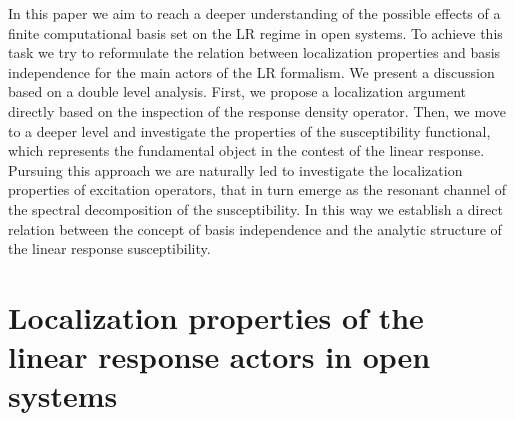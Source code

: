 \documentclass[reprint,aps,prb]{revtex4-1}
\begin{document}
In this paper we aim to reach a deeper understanding of the possible effects of a finite computational basis set on the LR regime in open systems. To achieve this task we try to
reformulate the relation between localization properties and basis independence for the main actors of the LR formalism. We present a discussion based on a double level analysis. First, 
we propose a localization argument directly based on the inspection of the response density operator. Then, we move to a deeper level and investigate the properties of the susceptibility 
functional, which represents the fundamental object in the contest of the linear response. Pursuing this approach we are naturally led to investigate the localization properties of excitation 
operators, that in turn emerge as the resonant channel of the spectral decomposition of the susceptibility. In this way we establish a direct relation between the concept of basis independence 
and the analytic structure of the linear response susceptibility.


\section{Localization properties of the linear response actors in open systems}
\end{document}
